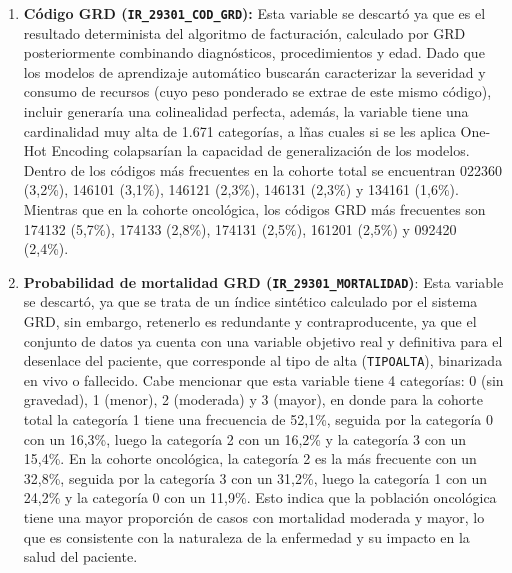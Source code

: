 \begin{enumerate}
    \item \textbf{Código GRD (\texttt{IR\_29301\_COD\_GRD}):} Esta variable se descartó ya que es el resultado determinista del algoritmo de facturación, calculado por GRD posteriormente combinando diagnósticos, procedimientos y edad. Dado que los modelos de aprendizaje automático buscarán caracterizar la severidad y consumo de recursos (cuyo peso ponderado se extrae de este mismo código), incluir generaría una colinealidad perfecta, además, la variable tiene una cardinalidad muy alta de 1.671 categorías, a lñas cuales si se les aplica One-Hot Encoding colapsarían la capacidad de generalización de los modelos. Dentro de los códigos más frecuentes en la cohorte total se encuentran 022360 (3,2\%), 146101 (3,1\%), 146121 (2,3\%), 146131 (2,3\%) y 134161 (1,6\%). Mientras que en la cohorte oncológica, los códigos GRD más frecuentes son 174132 (5,7\%), 174133 (2,8\%), 174131 (2,5\%), 161201 (2,5\%) y 092420 (2,4\%).
    \item \textbf{Probabilidad de mortalidad GRD (\texttt{IR\_29301\_MORTALIDAD})}: Esta variable se descartó, ya que se trata de un índice sintético calculado por el sistema GRD, sin embargo, retenerlo es redundante y contraproducente, ya que el conjunto de datos ya cuenta con una variable objetivo real y definitiva para el desenlace del paciente, que corresponde al tipo de alta (\texttt{TIPOALTA}), binarizada en vivo o fallecido. Cabe mencionar que esta variable tiene 4 categorías: 0 (sin gravedad), 1 (menor), 2 (moderada) y 3 (mayor), en donde para la cohorte total la categoría 1 tiene una frecuencia de 52,1\%, seguida por la categoría 0 con un 16,3\%, luego la categoría 2 con un 16,2\% y la categoría 3 con un 15,4\%. En la cohorte oncológica, la categoría 2 es la más frecuente con un 32,8\%, seguida por la categoría 3 con un 31,2\%, luego la categoría 1 con un 24,2\% y la categoría 0 con un 11,9\%. Esto indica que la población oncológica tiene una mayor proporción de casos con mortalidad moderada y mayor, lo que es consistente con la naturaleza de la enfermedad y su impacto en la salud del paciente.

\end{enumerate}
